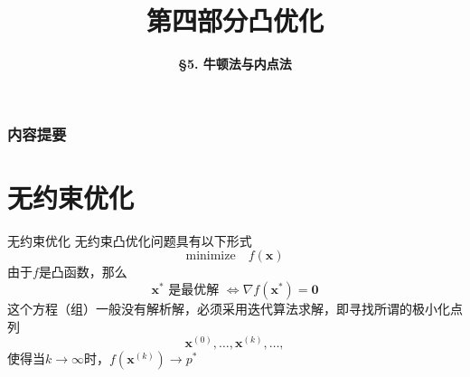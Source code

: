 



\title[Convex Optimization]{\LARGE \bfseries 第四部分\quad 凸优化} %
\author[Newton’s Method and Interior-Point Methods] %
{\Large \bfseries \S 5. 牛顿法与内点法}
\date{}






\begin{frame}

\titlepage %

\end{frame}


\begin{frame}
\frametitle{内容提要} %
\tableofcontents %
\end{frame}


\section{无约束优化}


\begin{frame}

\begin{block}{无约束优化}
无约束凸优化问题具有以下形式
$$\text{minimize} \quad f(\mathbf{x})$$
由于$f$是凸函数，那么
$$\mathbf{x}^* \text{ 是最优解 } \Longleftrightarrow \nabla f(\mathbf{x}^*) = \mathbf{0}$$
这个方程（组）一般没有解析解，必须采用迭代算法求解，即寻找所谓的极小化点列
$$\mathbf{x}^{(0)}, \ldots, \mathbf{x}^{(k)}, \ldots,$$
使得当$k\to\infty$时，$f(\mathbf{x}^{(k)}) \to p^*$
\end{block}

\end{frame}

